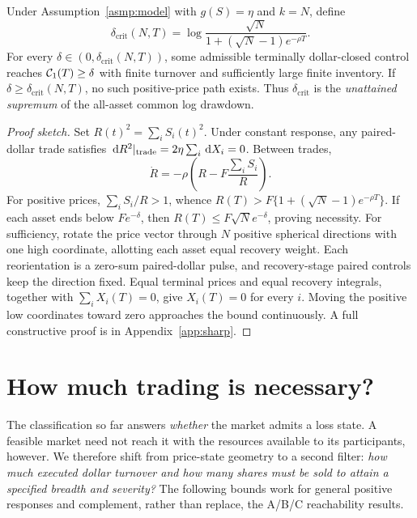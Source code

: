 \documentclass[review,hidelinks,onefignum,onetabnum]{siamonline250211}
\begin{document}
\begin{theorem}\label{thm:critical}
Under Assumption~\ref{asmp:model} with $g(S)=\eta$ and $k=N$, define
\begin{equation}\label{eq:critical}
\boxed{\delta_{\mathrm{crit}}(N,T)=
\log\frac{\sqrt N}{1+(\sqrt N-1)e^{-\rho T}}.}
\end{equation}
For every $\delta\in(0,\delta_{\mathrm{crit}}(N,T))$, some admissible terminally dollar-closed control reaches $\mathcal{C}_1(T)\ge\delta$ with finite turnover and sufficiently large finite inventory. If $\delta\ge\delta_{\mathrm{crit}}(N,T)$, no such positive-price path exists. Thus $\delta_{\mathrm{crit}}$ is the \emph{unattained supremum} of the all-asset common log drawdown.
\end{theorem}
\begin{proof}[Proof sketch]
Set $R(t)^2=\sum_iS_i(t)^2$. Under constant response, any paired-dollar trade satisfies $\,\mathrm{d} R^2|_{\rm trade}=2\eta\sum_i\,\mathrm{d} X_i=0$. Between trades,
\[
\dot R=-\rho\left(R-F\frac{\sum_iS_i}{R}\right).
\]
For positive prices, $\sum_iS_i/R>1$, whence $R(T)>F\{1+(\sqrt N-1)e^{-\rho T}\}$. If each asset ends below $Fe^{-\delta}$, then $R(T)\le F\sqrt Ne^{-\delta}$, proving necessity. For sufficiency, rotate the price vector through $N$ positive spherical directions with one high coordinate, allotting each asset equal recovery weight. Each reorientation is a zero-sum paired-dollar pulse, and recovery-stage paired controls keep the direction fixed. Equal terminal prices and equal recovery integrals, together with $\sum_iX_i(T)=0$, give $X_i(T)=0$ for every $i$. Moving the positive low coordinates toward zero approaches the bound continuously. A full constructive proof is in Appendix~\ref{app:sharp}.
\end{proof}


\section{How much trading is necessary?}\label{sec:budget}
The classification so far answers \emph{whether} the market admits a loss state. A feasible market need not reach it with the resources available to its participants, however. We therefore shift from price-state geometry to a second filter: \emph{how much executed dollar turnover and how many shares must be sold to attain a specified breadth and severity?} The following bounds work for general positive responses and complement, rather than replace, the A/B/C reachability results.
\end{document}
